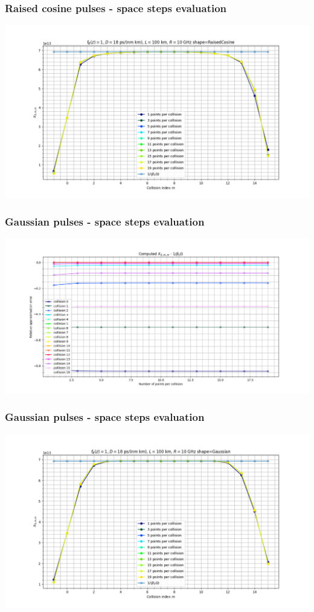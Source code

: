 \documentclass[8pt]{beamer} %
\begin{document}
\begin{frame}
	\frametitle{Raised cosine pulses - space steps evaluation}
	\includegraphics[width=\textwidth]{"./images/sim/spatial_RC.png"}
\end{frame}

\begin{frame}
	\frametitle{Gaussian pulses - space steps evaluation}
	\includegraphics[width=\textwidth]{"./images/sim/spatial_collision_G.png"}
\end{frame}

\begin{frame}
	\frametitle{Gaussian pulses - space steps evaluation}
	\includegraphics[width=\textwidth]{"./images/sim/spatial_G.png"}
\end{frame}
\end{document}
